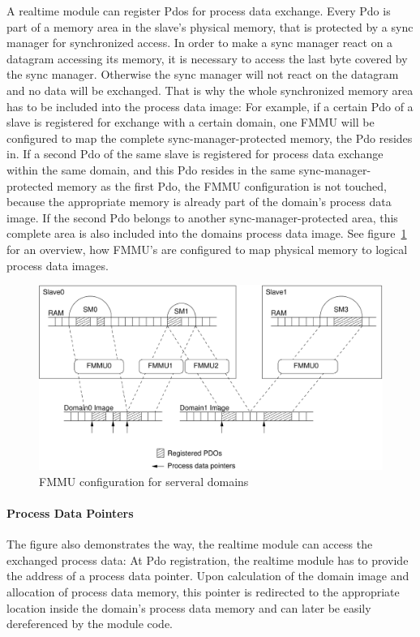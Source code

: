 \documentclass[a4paper,12pt,BCOR6mm,bibtotoc,idxtotoc]{scrbook}
\begin{document}
A realtime module can register Pdos for process data exchange. Every
Pdo is part of a memory area in the slave's physical memory, that is
protected by a sync manager \cite[section~6.7]{dlspec} for
synchronized access. In order to make a sync manager react on a
datagram accessing its memory, it is necessary to access the last byte
covered by the sync manager. Otherwise the sync manager will not react
on the datagram and no data will be exchanged. That is why the whole
synchronized memory area has to be included into the process data
image: For example, if a certain Pdo of a slave is registered for
exchange with a certain domain, one FMMU will be configured to map the
complete sync-manager-protected memory, the Pdo resides in. If a
second Pdo of the same slave is registered for process data exchange
within the same domain, and this Pdo resides in the same
sync-manager-protected memory as the first Pdo, the FMMU configuration
is not touched, because the appropriate memory is already part of the
domain's process data image.  If the second Pdo belongs to another
sync-manager-protected area, this complete area is also included into
the domains process data image. See figure~\ref{fig:fmmus} for an
overview, how FMMU's are configured to map physical memory to logical
process data images.

\begin{figure}[htbp]
  \centering
  \includegraphics[width=\textwidth]{images/fmmus}
  \caption{FMMU configuration for serveral domains}
  \label{fig:fmmus}
\end{figure}

\paragraph{Process Data Pointers}

The figure also demonstrates the way, the realtime module can access the
exchanged process data: At Pdo registration, the realtime module has
to provide the address of a process data pointer. Upon calculation of
the domain image and allocation of process data memory, this pointer
is redirected to the appropriate location inside the domain's process
data memory and can later be easily dereferenced by the module code.
\end{document}
